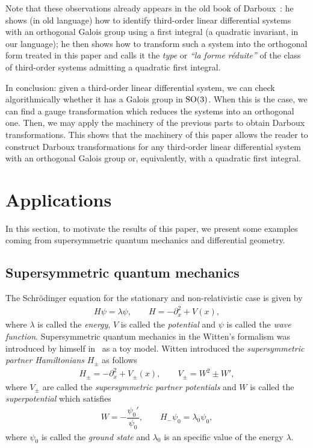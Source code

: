 \documentclass[pdftex]{sigma}%
\numberwithin{equation}{section}
\begin{document}
Note that these observations already appears in the old book of Darboux~\cite[p.~28--29]{da3}: he shows (in old language) how to identify third-order linear differential systems with an orthogonal Galois group using a first integral (a quadratic invariant, in our language); he then shows how to transform such a system into the orthogonal form treated in this paper and calls it the \emph{type} or 	\emph{``la forme r\'eduite''} of the class of third-order systems admitting a quadratic first integral.

In conclusion: given a third-order linear differential system, we can check algorithmically whether it has a Galois group in ${\rm SO}(3)$. When this is the case, we can find a gauge transformation which reduces the systems into an orthogonal one. Then, we may apply the machinery of the previous parts to obtain Darboux transformations. This shows that the machinery of this paper allows the reader to construct Darboux transformations for any third-order linear differential system with an orthogonal Galois group or, equivalently, with a quadratic first integral.

\section{Applications}\label{applications}
In this section, to motivate the results of this paper, we present some examples coming from supersymmetric quantum mechanics and differential geometry.

\subsection{Supersymmetric quantum mechanics}\label{sec:SUSY}

The Schr\"odinger equation for the stationary and non-relativistic case is given by
\begin{gather*}
H\psi=\lambda \psi,\qquad H=-\partial_x^2 +V(x),
\end{gather*}
where $\lambda$ is called the \emph{energy}, $V$ is called the \emph{potential} and $\psi$ is called the \emph{wave function}. Supersymmetric quantum mechanics in the Witten's formalism was introduced by himself in~\cite[Section~6]{wi} as a toy model. Witten introduced the \emph{supersymmetric partner Hamiltonians} $H_\pm$ as follows
\begin{gather*}
H_\pm=- \partial_x^2 +V_\pm(x),\qquad V_\pm=W^2\pm W',
\end{gather*}
where $V_\pm$ are called the \emph{supersymmetric partner potentials} and $W$ is called the \emph{superpotential} which satisfies
\begin{gather*}
W=-\dfrac{\psi_0'}{\psi_0},\qquad H_-\psi_0=\lambda_0\psi_0,
\end{gather*}
where $\psi_0$ is called the \emph{ground state} and $\lambda_0$ is an specific value of the energy $\lambda$.
\end{document}
